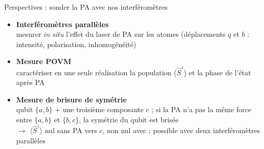 \documentclass[aspectratio=169, 11pt]{beamer}
\begin{document}
\begin{frame}{Perspectives : sonder la PA avec nos interféromètres}
  \begin{itemize}
    \item<1-> \textbf{Interféromètres parallèles}\\
      {\small mesurer \textit{in situ} l'effet du laser de PA sur les atomes
      (déplacements $q$ et $b$ : intensité, polarisation, inhomogénéité)}
    \item<2-> \textbf{Mesure POVM}\\
      {\small caractériser en une seule réalisation la population ($\hat S^z$) \alert{et} la phase
      de l'état après PA}
    \item<3-> \textbf{Mesure de brisure de symétrie}\\
      {\small qubit $\{a,b\}$ + une troisième composante $c$ ;
      si la PA n'a pas la même force entre $\{a,b\}$ et $\{b,c\}$, la symétrie du qubit est brisée}\\
      {\small $\to$ $\langle \hat S^z\rangle$ nul sans PA vers $c$, non nul avec ;
      possible avec deux interféromètres parallèles}
  \end{itemize}
\end{frame}
\end{document}
